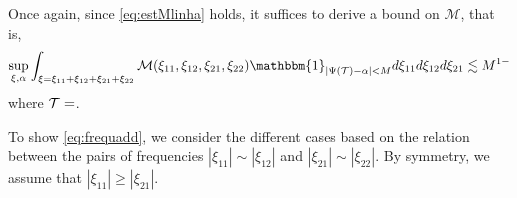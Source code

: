 \documentclass[%
11pt,  reqno]{amsart}
\makeatletter
\newcommand{\jap}[1]{\langle #1 \rangle}
\newcommand{\5}{\textup{V}}
\newcommand{\noi}{\noindent}
\newcommand{\ind}{\mathbbm 1}
\newcommand{\les}{\lesssim}
\newcommand{\wt}{\widetilde}
\theoremstyle{remark}
\newcommand{\bul}{\bullet}
\newcommand{\TT}{\mathcal{T}}
\newcommand{\al}{\alpha}
\newcommand{\G}{\Gamma}
\newcommand{\bfrak}{\mathfrak{b}}
\newcommand{\gfrak}{\mathfrak{g}}
\newcommand{\pb}{\mathbf{p}}
\newcommand{\sbf}{\mathbf{s}}
\newcommand{\ges}{\gtrsim}
\newcommand{\jb}[1]
{\langle #1 \rangle}
\newcommand{\M}{\mathcal{M}}
\DeclareMathOperator{\mul}{mul}
\def\<#1>{\csname MH@symb@#1\endcsname}
\numberwithin{equation}{section}
\numberwithin{theorem}{section}
\makeatother
\begin{document}
Once again, since \eqref{eq:estMlinha} holds, it suffices to derive a bound on $\M$, that is,
\begin{align}\label{eq:frequadd}
    \sup_{\xi, \al} 
\int_{\xi=\xi_{11} + \xi_{12} + \xi_{21} + \xi_{22}} \mathcal{M}(\xi_{11}, \xi_{12}, \xi_{21}, \xi_{22}) \mathbbm{1}_{|\Psi(\TT)-\alpha|<M}d\xi_{11}d\xi_{12}d\xi_{21}
\les M^{1-}
\end{align}
where $\TT=\<33>$.

To show \eqref{eq:frequadd}, we consider the different cases based on the relation between the pairs of frequencies $|\xi_{11}|\sim |\xi_{12}|$ and $|\xi_{21}| \sim |\xi_{22}|$. By symmetry, we assume that $|\xi_{11}| \ge|\xi_{21}|$.
\end{document}
